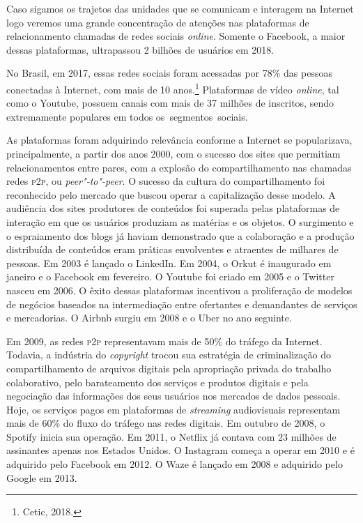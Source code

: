Caso sigamos os trajetos das unidades que se comunicam e interagem na
Internet logo veremos uma grande concentração de atenções nas
plataformas de relacionamento chamadas de redes sociais \emph{online}. Somente
o Facebook, a maior dessas plataformas, ultrapassou 2 bilhões de
usuários em 2018. 

No Brasil, em 2017, essas redes sociais foram acessadas
por 78\% das pessoas conectadas à Internet, com mais de 10 anos.\footnote{Cetic,
2018.} Plataformas de vídeo \emph{online}, tal como o Youtube, possuem canais
com mais de 37 milhões de inscritos, sendo extremamente populares em
todos os~segmentos~sociais.

As plataformas foram adquirindo relevância conforme a Internet se
popularizava, principalmente, a partir dos anos 2000, com o sucesso dos
sites que permitiam relacionamentos entre pares, com a explosão do
compartilhamento nas chamadas redes \textsc{p2p}, ou \emph{peer"-to"-peer}. O sucesso da
cultura do compartilhamento foi reconhecido pelo mercado que buscou
operar a capitalização desse modelo. A audiência dos sites produtores de
conteúdos foi superada pelas plataformas de interação em que os usuários
produziam as matérias e os objetos. O surgimento e o espraiamento dos
blogs já haviam demonstrado que a colaboração e a produção distribuída
de conteúdos eram práticas envolventes e atraentes de milhares de
pessoas. Em 2003 é lançado o LinkedIn. Em 2004, o Orkut é inaugurado em
janeiro e o Facebook em fevereiro. O Youtube foi criado em 2005 e o
Twitter nasceu em 2006. O êxito dessas plataformas incentivou a
proliferação de modelos de negócios baseados na intermediação entre
ofertantes e demandantes de serviços e mercadorias. O Airbnb surgiu em
2008 e o Uber no ano seguinte.

Em 2009, as redes \textsc{p2p} representavam mais de 50\% do tráfego da Internet.
Todavia, a indústria do \emph{copyright} trocou sua estratégia de
criminalização do compartilhamento de arquivos digitais pela apropriação
privada do trabalho colaborativo, pelo barateamento dos serviços e
produtos digitais e pela negociação das informações dos seus usuários
nos mercados de dados pessoais. Hoje, os serviços pagos em plataformas
de \emph{streaming} audiovisuais representam mais de 60\% do fluxo do tráfego
nas redes digitais. Em outubro de 2008, o Spotify inicia sua operação.
Em 2011, o Netflix já contava com 23 milhões de assinantes apenas nos
Estados Unidos. O Instagram começa a operar em 2010 e é adquirido pelo
Facebook em 2012. O Waze é lançado em 2008 e adquirido pelo Google em
2013.


